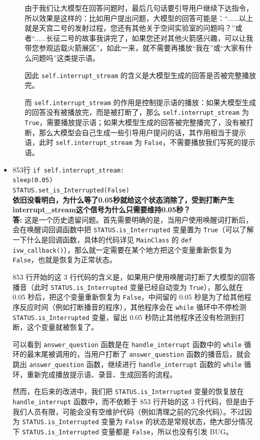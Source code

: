 \documentclass[]{article}
\begin{document}
\begin{itemize}
\begin{itemize}
		由于我们让大模型在回答问题时，最后几句话要引导用户继续下达指令，所以效果是这样的：比如用户提出问题，大模型的回答可能是：“......以上就是天宫二号的发射过程，您还有其他关于空间实验室的问题吗？”或者“......长征二号的故事我讲完了，如果您还对其他火箭感兴趣，可以让我带您参观运载火箭展区”，如此一来，就不需要再播放“我在”或“大家有什么问题吗”这类提示语。
		
		因此 \texttt{self.interrupt\_stream} 的含义是大模型生成的回答是否被完整播放完。
		
		而 \texttt{self.interrupt\_stream} 的作用是控制提示语的播放：如果大模型生成的回答没有被播放完，而是被打断了，那么 \texttt{self.interrupt\_stream} 为 \texttt{True}，需要播放提示语；如果大模型生成的回答被完整播完了，没有被打断，那么大模型会自己生成一些引导用户提问的话，其作用相当于提示语，此时 \texttt{self.interrupt\_stream} 为 \texttt{False}，不需要播放我们写死的提示语。
	\end{itemize}
	\item 853行 \texttt{if self.interrupt\_stream:}\\
	\texttt{sleep(0.05)}\\
	\texttt{STATUS.set\_is\_Interrupted(False)}\\
	\textbf{依旧没看明白，为什么等了0.05秒就给这个状态消除了，受到打断产生interrupt\_stream这个信号为什么只需要维持0.05秒？}\\
\textbf{答:} 这是一个历史遗留问题。首先需要明确的是，当用户使用唤醒词打断后，会在唤醒词回调函数中把 \texttt{STATUS.is\_Interrupted} 变量置为 \texttt{True}（可以了解一下什么是回调函数，具体的代码详见 \texttt{MainClass} 的 \texttt{def ivw\_callback()}），那么就一定需要在某个地方把这个变量重新恢复为 \texttt{False}，也就是恢复为正常状态。

\hspace{2em} 853 行开始的这 3 行代码的含义是，如果用户使用唤醒词打断了大模型的回答播音（此时 \texttt{STATUS.is\_Interrupted} 变量已经自动变为 \texttt{True}），那么就在 0.05 秒后，把这个变量重新恢复为 \texttt{False}，中间留的 0.05 秒是为了给其他程序反应时间（例如打断播音的程序），其他程序会在 \texttt{while} 循环中不停检测 \texttt{STATUS.is\_Interrupted} 变量，留出 0.05 秒防止其他程序还没有检测到打断，这个变量就被恢复了。

\hspace{2em} 可以看到 \texttt{answer\_question} 函数是在 \texttt{handle\_interrupt} 函数中的 \texttt{while} 循环的最末尾被调用的，当用户打断了 \texttt{answer\_question} 函数的播音后，就会跳出 \texttt{answer\_question} 函数，继续进行 \texttt{handle\_interrupt} 函数的 \texttt{while} 循环，重新完成播放提示语、录音、生成回答的流程。

\hspace{2em} 然而，在后来的改进中，我们把 \texttt{STATUS.is\_Interrupted} 变量的恢复放在 \texttt{handle\_interrupt} 函数中，而不依赖于 853 行开始的这 3 行代码，但是由于我们人员有限，可能会没有空维护代码（例如清理之前的冗余代码）。不过因为 \texttt{STATUS.is\_Interrupted} 变量为 \texttt{False} 的状态是常规状态，绝大部分情况下 \texttt{STATUS.is\_Interrupted} 变量都是 \texttt{False}，所以也没有引发 BUG。
\end{itemize}
\end{document}
